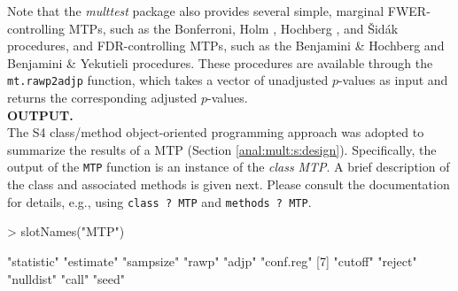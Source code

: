 \documentclass[11pt]{article}
\newcommand{\Rpackage}[1]{\textit{#1}}
\newcommand{\Robject}[1]{\texttt{#1}}
\newcommand{\Rclass}[1]{\textit{#1}}
\begin{document}
Note that the \Rpackage{multtest} package also provides several simple, marginal FWER-controlling MTPs, such as the Bonferroni, Holm \cite{Holm79}, Hochberg \cite{Hochberg88}, and \v{S}id\'{a}k \cite{Sidak67} procedures, and FDR-controlling MTPs, such as the Benjamini \& Hochberg \cite{Benjamini&Hochberg95} and Benjamini \& Yekutieli \cite{Benjamini&Yekutieli01} procedures. 
These procedures are available through the \Robject{mt.rawp2adjp} function, which takes a vector of unadjusted $p$-values as input and returns the corresponding adjusted $p$-values.\\


\noindent
{\bf  OUTPUT.}\\


The S4 class/method object-oriented programming approach was adopted to summarize the results of a MTP (Section \ref{anal:mult:s:design}). 
Specifically, the output of the \Robject{MTP} function is an instance of the {\em class} \Rclass{MTP}. 
A brief description of the class and associated methods is given next. Please consult the documentation for details, e.g., using \texttt{class ? MTP} and \texttt{methods ? MTP}. 

\begin{Schunk}
\begin{Sinput}
> slotNames("MTP")
\end{Sinput}
\begin{Soutput}
 [1] "statistic" "estimate"  "sampsize"  "rawp"      "adjp"      "conf.reg" 
 [7] "cutoff"    "reject"    "nulldist"  "call"      "seed"     
\end{Soutput}
\end{Schunk}
\end{document}
